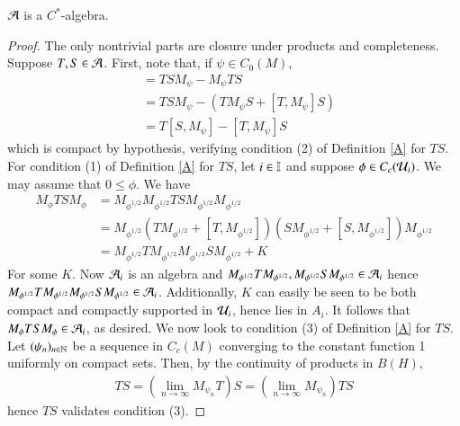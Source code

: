 \documentclass[leqno]{amsart}
\begin{document}
	\begin{proposition}\label{globalisation-algebra}
		${\mathcal A}$ is a $C^*$-algebra.
	\end{proposition}
	\begin{proof}
		The only nontrivial parts are closure under products and completeness. Suppose $T,S\in {\mathcal A}$. First, note that, if $\psi\in C_0(M)$,
		\begin{align*}
			[TS, M_\psi]&=TSM_\psi-M_\psi TS\\
			&=TSM_\psi-(T M_\psi S+[T, M_\psi]S)\\
			&=T[S, M_\psi]-[T, M_\psi]S
		\end{align*}
		which is compact by hypothesis, verifying condition (2) of Definition \ref{A} for $TS$. For condition (1) of Definition \ref{A} for $TS$, let $i\in\mathbb I$ and suppose $\phi\in C_c({\mathcal U}_i)$. We may assume that $0\leq\phi$. We have
		\begin{align*}
			M_\phi TS M_\phi &= M_{\phi^{1/2}}M_{\phi^{1/2}}TSM_{\phi^{1/2}}M_{\phi^{1/2}}\\
			&=M_{\phi^{1/2}}(TM_{\phi^{1/2}}+[T,M_{\phi^{1/2}}])(SM_{\phi^{1/2}}+[S,M_{\phi^{1/2}}])M_{\phi^{1/2}}\\
			&=M_{\phi^{1/2}}TM_{\phi^{1/2}}M_{\phi^{1/2}}SM_{\phi^{1/2}}+K
		\end{align*}
		For some $K$. Now ${\mathcal A}_i$ is an algebra and $M_{\phi^{1/2}}TM_{\phi^{1/2}},M_{\phi^{1/2}}SM_{\phi^{1/2}}\in {\mathcal A}_i$ hence $M_{\phi^{1/2}}TM_{\phi^{1/2}}M_{\phi^{1/2}}SM_{\phi^{1/2}}\in{\mathcal A}_i$. Additionally, $K$ can easily be seen to be both compact and compactly supported in ${\mathcal U}_i$, hence lies in $A_i$. It follows that $M_\phi TSM_\phi\in{\mathcal A}_i$, as desired. We now look to condition (3) of Definition \ref{A} for $TS$. Let $(\psi_n)_{n\in\mathbb{N}}$ be a sequence in $C_{c}(M)$ converging to the constant function 1 uniformly on compact sets. Then, by the continuity of products in $B(H)$,
		\begin{align*}
			TS=(\lim_{n\to\infty} M_{\psi_n} T)S=(\lim_{n\to\infty} M_{\psi_n} )TS
		\end{align*}
		hence $TS$ validates condition (3).
		

\end{proof}
\end{document}
